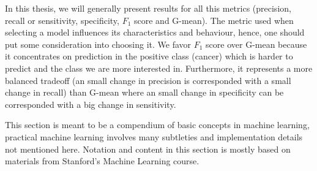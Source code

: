 In this thesis, we will generally present results for all this metrics (precision, recall or sensitivity, specificity, $F_1$ score and G-mean). The metric used when selecting a model influences its characteristics and behaviour, hence, one should put some consideration into choosing it. We favor $F_1$ score over G-mean because it concentrates on prediction in the positive class (cancer) which is harder to predict and the class we are more interested in. Furthermore, it represents a more balanced tradeoff (an small change in precision is corresponded with a small change in recall) than G-mean where an small change in specificity can be corresponded with a big change in sensitivity.
\begin{comment} Discussion of why G-mean over F1
(Not sure about this) As a rule of thumb, using G-mean will generate models that predict more positives given that the sensitivity will greatly improve and specificity will only slightly decrease. Using $F_1$ score, the model will predict less positives as that will improve precision but only slightly decrease sensitivity. 

Why G-means? Because it is more important to obtain a low error in specificity than in precision, i .e, would you prefer a 90%

Using G-mean i will predict more positives, no matter what. My sensitivity is going to vastly improve and the specificity will only decrease a little, but the precision is gonna take a hit. Because if I predict less positives sensitivity is gonna go down, specificity is gonna go up (as I add more true negatives) but just a little and precision  would go up (but it wouldn't matter for g-mean).

Using F1 I'll probably predict less positives, sensitivity is going to go slightly down, and precision is going to go up, specificity doesn{t matter but it will decrease a little. Or I'll probably predcit as many poositives as needed. It focuses more on the positive class.

Other diagonal, the algorithm will learn negatives pretty well, so the one that predicts less positives(f1) probably isn{t learning much (it is predicting all negative).
\end{comment}

This section is meant to be a compendium of basic concepts in machine learning, practical machine learning involves many subtleties and implementation details not mentioned here. Notation and content in this section is mostly based on materials from Stanford's Machine Learning course\cite{Ng2014}.

